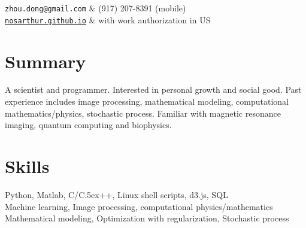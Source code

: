 \documentclass[centered,11pt,overlapped]{res}
\def\Cplusplus{{\rm C\raise.5ex\hbox{\small ++}}}
\begin{document}


\begin{resume}

\begin{ncolumn}{2}
   {\tt zhou.dong@gmail.com} &  (917) 207-8391 (mobile) \\
   {\tt \href{nosarthur.github.io}{nosarthur.github.io}} &  with work authorization in US
\end{ncolumn}


\section{\sc Summary}
A scientist and programmer. 
Interested in personal growth and social good.
Past experience includes image processing, mathematical modeling, computational mathematics/physics, stochastic process. Familiar with magnetic resonance imaging, quantum computing and biophysics.


\section{\sc Skills}
Python, Matlab, C/\Cplusplus, Linux shell scripts, d3.js, SQL \\
Machine learning, Image processing, computational physics/mathematics\\
Mathematical modeling, Optimization with regularization, Stochastic process 
\end{resume}
\end{document}
